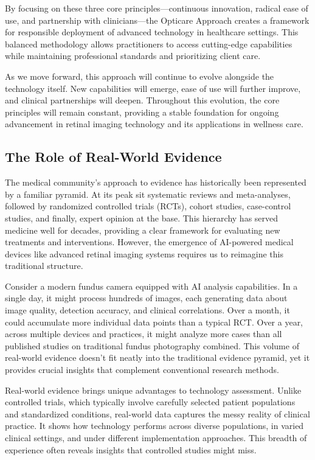 \documentclass[
  Letterpaper,
]{scrbook}
\begin{document}
By focusing on these three core principles---continuous innovation,
radical ease of use, and partnership with clinicians---the Opticare
Approach creates a framework for responsible deployment of advanced
technology in healthcare settings. This balanced methodology allows
practitioners to access cutting-edge capabilities while maintaining
professional standards and prioritizing client care.

As we move forward, this approach will continue to evolve alongside the
technology itself. New capabilities will emerge, ease of use will
further improve, and clinical partnerships will deepen. Throughout this
evolution, the core principles will remain constant, providing a stable
foundation for ongoing advancement in retinal imaging technology and its
applications in wellness care.

\subsection*{The Role of Real-World
Evidence}\label{the-role-of-real-world-evidence}

The medical community's approach to evidence has historically been
represented by a familiar pyramid. At its peak sit systematic reviews
and meta-analyses, followed by randomized controlled trials (RCTs),
cohort studies, case-control studies, and finally, expert opinion at the
base. This hierarchy has served medicine well for decades, providing a
clear framework for evaluating new treatments and interventions.
However, the emergence of AI-powered medical devices like advanced
retinal imaging systems requires us to reimagine this traditional
structure.

Consider a modern fundus camera equipped with AI analysis capabilities.
In a single day, it might process hundreds of images, each generating
data about image quality, detection accuracy, and clinical correlations.
Over a month, it could accumulate more individual data points than a
typical RCT. Over a year, across multiple devices and practices, it
might analyze more cases than all published studies on traditional
fundus photography combined. This volume of real-world evidence doesn't
fit neatly into the traditional evidence pyramid, yet it provides
crucial insights that complement conventional research methods.

Real-world evidence brings unique advantages to technology assessment.
Unlike controlled trials, which typically involve carefully selected
patient populations and standardized conditions, real-world data
captures the messy reality of clinical practice. It shows how technology
performs across diverse populations, in varied clinical settings, and
under different implementation approaches. This breadth of experience
often reveals insights that controlled studies might miss.
\end{document}
